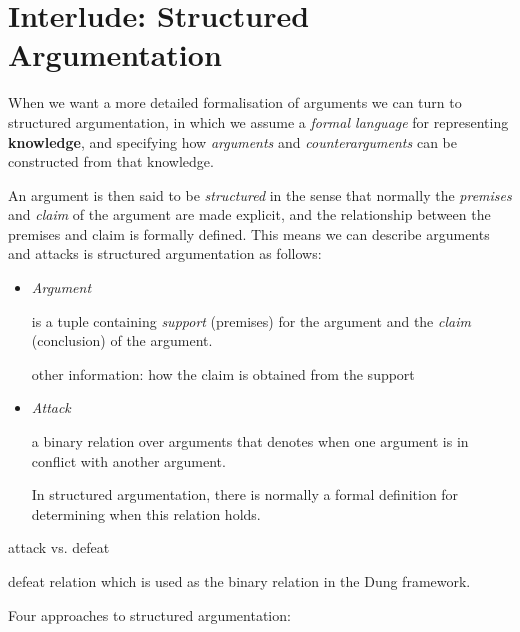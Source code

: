 \section{Interlude: Structured Argumentation}


When we want a more detailed formalisation of arguments we can turn to structured argumentation, 
in which we assume a \textit{formal language} for representing \textbf{knowledge}, 
and specifying how \textit{arguments} and \textit{counterarguments} can be constructed from that knowledge.



An argument is then said to be \textit{structured} in the sense that normally the \textit{premises} and \textit{claim} of the argument are made explicit, 
and the relationship between the premises and claim is formally defined.
% 
This means we can describe arguments and attacks is structured argumentation as follows:
\begin{itemize}[itemsep=5pt,parsep=5pt,leftmargin=3em,topsep=5pt]
    \item 
    \textit{Argument}

    is a tuple containing \textit{support} (premises) for the argument and the \textit{claim} (conclusion) of the argument.

    other information: 
    how the claim is obtained from the support

    \item 
    \textit{Attack}

    a binary relation over arguments that denotes when one argument is in conflict with another argument. 

    In structured argumentation, there is normally a formal definition for determining when this relation holds.
\end{itemize}


\vspace{2em}


attack vs. defeat

defeat relation which is used as the binary relation in the Dung framework.




\vspace{1.5em}

Four approaches to structured argumentation: 

